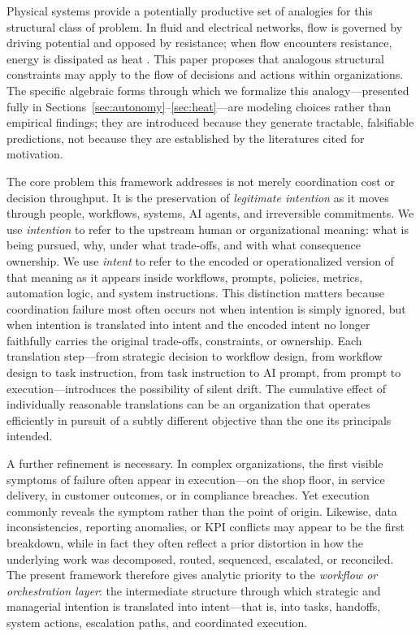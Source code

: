 \documentclass[12pt]{article}
\begin{document}
Physical systems provide a potentially productive set of analogies for this
structural class of problem. In fluid and electrical networks, flow is
governed by driving potential and opposed by resistance; when flow encounters
resistance, energy is dissipated as heat \citep{feynman1963lectures}. This
paper proposes that analogous structural constraints may apply to the flow of
decisions and actions within organizations. The specific algebraic forms
through which we formalize this analogy---presented fully in
Sections~\ref{sec:autonomy}--\ref{sec:heat}---are modeling choices rather than
empirical findings; they are introduced because they generate tractable,
falsifiable predictions, not because they are established by the literatures
cited for motivation.

The core problem this framework addresses is not merely coordination cost or
decision throughput. It is the preservation of \emph{legitimate intention} as
it moves through people, workflows, systems, AI agents, and irreversible
commitments. We use \emph{intention} to refer to the upstream human or
organizational meaning: what is being pursued, why, under what trade-offs, and
with what consequence ownership. We use \emph{intent} to refer to the encoded
or operationalized version of that meaning as it appears inside workflows,
prompts, policies, metrics, automation logic, and system instructions.
This distinction matters because coordination failure most often occurs not
when intention is simply ignored, but when intention is translated into intent
and the encoded intent no longer faithfully carries the original trade-offs,
constraints, or ownership. Each translation step---from strategic decision to
workflow design, from workflow design to task instruction, from task
instruction to AI prompt, from prompt to execution---introduces the possibility
of silent drift. The cumulative effect of individually reasonable translations
can be an organization that operates efficiently in pursuit of a subtly
different objective than the one its principals intended.

A further refinement is necessary. In complex organizations, the first visible
symptoms of failure often appear in execution---on the shop floor, in service
delivery, in customer outcomes, or in compliance breaches. Yet execution
commonly reveals the symptom rather than the point of origin. Likewise, data
inconsistencies, reporting anomalies, or KPI conflicts may appear to be the
first breakdown, while in fact they often reflect a prior distortion in how the
underlying work was decomposed, routed, sequenced, escalated, or reconciled.
The present framework therefore gives analytic priority to the
\emph{workflow or orchestration layer}: the intermediate structure through
which strategic and managerial intention is translated into intent---that is,
into tasks, handoffs, system actions, escalation paths, and coordinated
execution.
\end{document}
